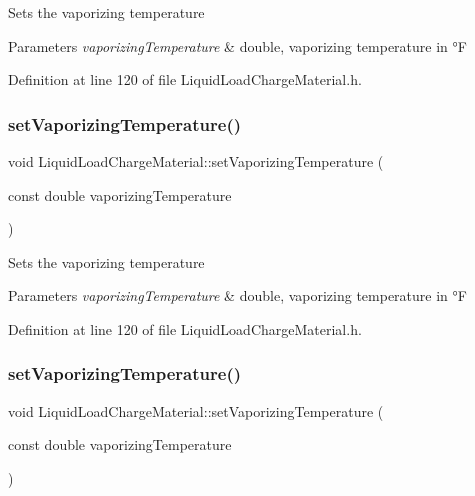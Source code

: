 Sets the vaporizing temperature 
\begin{DoxyParams}{Parameters}
{\em vaporizing\+Temperature} & double, vaporizing temperature in °F \\
\hline
\end{DoxyParams}


Definition at line 120 of file Liquid\+Load\+Charge\+Material.\+h.

\mbox{\label{class_liquid_load_charge_material_a50938e3270de5d3c59b872f290a761cc}} 
\subsubsection{\texorpdfstring{set\+Vaporizing\+Temperature()}{setVaporizingTemperature()}\hspace{0.1cm}{\footnotesize\ttfamily [2/3]}}
{\footnotesize\ttfamily void Liquid\+Load\+Charge\+Material\+::set\+Vaporizing\+Temperature (\begin{DoxyParamCaption}\item[{const double}]{vaporizing\+Temperature }\end{DoxyParamCaption})\hspace{0.3cm}{\ttfamily [inline]}}

Sets the vaporizing temperature 
\begin{DoxyParams}{Parameters}
{\em vaporizing\+Temperature} & double, vaporizing temperature in °F \\
\hline
\end{DoxyParams}


Definition at line 120 of file Liquid\+Load\+Charge\+Material.\+h.

\mbox{\label{class_liquid_load_charge_material_a50938e3270de5d3c59b872f290a761cc}} 
\subsubsection{\texorpdfstring{set\+Vaporizing\+Temperature()}{setVaporizingTemperature()}\hspace{0.1cm}{\footnotesize\ttfamily [3/3]}}
{\footnotesize\ttfamily void Liquid\+Load\+Charge\+Material\+::set\+Vaporizing\+Temperature (\begin{DoxyParamCaption}\item[{const double}]{vaporizing\+Temperature }\end{DoxyParamCaption})\hspace{0.3cm}{\ttfamily [inline]}}


